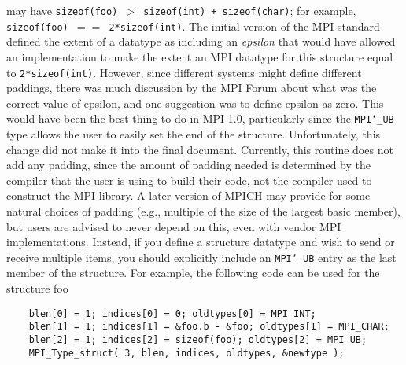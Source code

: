 may have {\tt sizeof(foo) $>$ sizeof(int) + sizeof(char)}; for example,
{\tt sizeof(foo) $=$$=$ 2*sizeof(int)}.  The initial version of the MPI standard
defined the extent of a datatype as including an {\em epsilon} that would have
allowed an implementation to make the extent an MPI datatype
for this structure equal to {\tt 2*sizeof(int)}.
However, since different systems might define different paddings, there was
much discussion by the MPI Forum about what was the correct value of
epsilon, and one suggestion was to define epsilon as zero.
This would have been the best thing to do in MPI 1.0, particularly since
the {\tt MPI{\tt \char`\_}UB} type allows the user to easily set the end of the structure.
Unfortunately, this change did not make it into the final document.
Currently, this routine does not add any padding, since the amount of
padding needed is determined by the compiler that the user is using to
build their code, not the compiler used to construct the MPI library.
A later version of MPICH may provide for some natural choices of padding
(e.g., multiple of the size of the largest basic member), but users are
advised to never depend on this, even with vendor MPI implementations.
Instead, if you define a structure datatype and wish to send or receive
multiple items, you should explicitly include an {\tt MPI{\tt \char`\_}UB} entry as the
last member of the structure.  For example, the following code can be used
for the structure foo
\begin{verbatim}
    blen[0] = 1; indices[0] = 0; oldtypes[0] = MPI_INT;
    blen[1] = 1; indices[1] = &foo.b - &foo; oldtypes[1] = MPI_CHAR;
    blen[2] = 1; indices[2] = sizeof(foo); oldtypes[2] = MPI_UB;
    MPI_Type_struct( 3, blen, indices, oldtypes, &newtype );
\end{verbatim}

